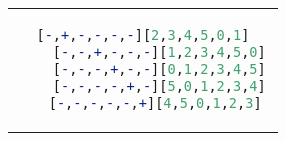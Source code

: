 \begin{figure}
    \centering
    \begin{tabular}{c}
    \begin{lstlisting}[language=Prolog]
    [-,+,-,-,-,-][2,3,4,5,0,1]
    [-,-,+,-,-,-][1,2,3,4,5,0]
    [-,-,-,+,-,-][0,1,2,3,4,5]
    [-,-,-,-,+,-][5,0,1,2,3,4]
    [-,-,-,-,-,+][4,5,0,1,2,3] 
    \end{lstlisting}
    \end{tabular}
    \label{code:future_work}
\end{figure}